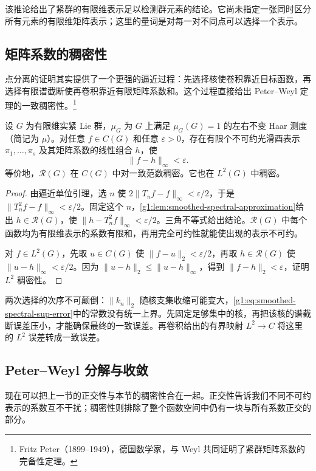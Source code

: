 该推论给出了紧群的有限维表示足以检测群元素的结论。它尚未指定一张同时区分所有元素的有限维矩阵表示；这里的量词是对每一对不同点可以选择一个表示。

\subsection{矩阵系数的稠密性}
\label{g1:subsec:2002:06}
点分离的证明其实提供了一个更强的逼近过程：先选择核使卷积靠近目标函数，再选择有限谱截断使再卷积靠近有限矩阵系数和。这个过程直接给出 Peter--Weyl 定理的一致稠密性。\footnote{Fritz Peter（1899--1949），德国数学家，与 Weyl 共同证明了紧群矩阵系数的完备性定理。}

\begin{theorem}\label{g1:thm:peter-weyl-density}
	设 \(G\) 为有限维实紧 Lie 群，\(\mu_G\) 为 \(G\) 上满足 \(\mu_G(G)=1\) 的左右不变 Haar 测度（简记为 \(\mu\)）。对任意 \(f\in C(G)\) 和任意 \(\varepsilon>0\)，存在有限个不可约光滑酉表示 \(\pi_1,\ldots,\pi_s\) 及其矩阵系数的线性组合 \(h\)，使
	\[
		\|f-h\|_\infty<\varepsilon.
	\]
	等价地，\(\mathcal R(G)\) 在 \(C(G)\) 中对一致范数稠密。它也在 \(L^2(G)\) 中稠密。
\end{theorem}
\begin{proof}
	由逼近单位引理，选 \(n\) 使 \(2\|T_nf-f\|_\infty<\varepsilon/2\)，于是 \(\|T_n^2f-f\|_\infty<\varepsilon/2\)。固定这个 \(n\)，\cref{g1:lem:smoothed-spectral-approximation}给出 \(h\in\mathcal R(G)\)，使 \(\|h-T_n^2f\|_\infty<\varepsilon/2\)。三角不等式给出结论。\(\mathcal R(G)\) 中每个函数均为有限维表示的系数有限和，再用完全可约性就能使出现的表示不可约。

	对 \(f\in L^2(G)\)，先取 \(u\in C(G)\) 使 \(\|f-u\|_2<\varepsilon/2\)，再取 \(h\in\mathcal R(G)\) 使 \(\|u-h\|_\infty<\varepsilon/2\)。因为 \(\|u-h\|_2\le\|u-h\|_\infty\)，得到 \(\|f-h\|_2<\varepsilon\)，证明 \(L^2\) 稠密性。
\end{proof}

两次选择的次序不可颠倒：\(\|k_n\|_2\) 随核支集收缩可能变大，\eqref{g1:eq:smoothed-spectral-sup-error}中的常数没有统一上界。先固定足够集中的核，再把该核的谱截断误差压小，才能确保最终的一致误差。再卷积给出的有界映射 \(L^2\to C\) 将这里的 \(L^2\) 误差转成一致误差。

\subsection{Peter–Weyl 分解与收敛}
\label{g1:subsec:2002:07}
现在可以把上一节的正交性与本节的稠密性合在一起。正交性告诉我们不同不可约表示的系数互不干扰；稠密性则排除了整个函数空间中仍有一块与所有系数正交的部分。

